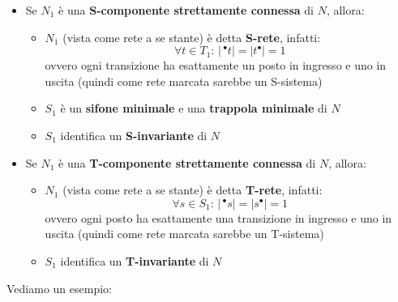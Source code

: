 \documentclass[a4paper,12pt, oneside]{book}
\begin{document}
\begin{itemize}
  \item Se $N_1$ è una \textbf{S-componente strettamente connessa} di $N$,
  allora:
  \begin{itemize}
    \item $N_1$ (vista come rete a se stante) è detta \textbf{S-rete}, infatti:
    \[\forall t\in T_1:\,|\,^\bullet t|=|t^\bullet|=1\]
    ovvero ogni transizione ha esattamente un posto in ingresso e uno in uscita
    (quindi come rete marcata sarebbe un S-sistema)
    \item $S_1$ è un \textbf{sifone minimale} e una \textbf{trappola minimale}
    di $N$
    \item $S_1$ identifica un \textbf{S-invariante} di $N$
  \end{itemize}
  \item Se $N_1$ è una \textbf{T-componente strettamente connessa} di $N$,
  allora:
  \begin{itemize}
    \item $N_1$ (vista come rete a se stante) è detta \textbf{T-rete}, infatti:
    \[\forall s\in S_1:\,|\,^\bullet s|=|s^\bullet|=1\]
    ovvero ogni posto ha esattamente una transizione in ingresso e uno in uscita
    (quindi come rete marcata sarebbe un T-sistema)
    \item $S_1$ identifica un \textbf{T-invariante} di $N$
  \end{itemize}
\end{itemize}
Vediamo un esempio:
\end{document}
